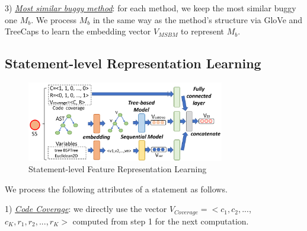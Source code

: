 
3) {\em \underline{Most similar buggy method}}: for each method, we
keep the most similar buggy one $M_b$. We process $M_b$ in the same
way as the method's structure via GloVe and TreeCaps to learn the
embedding vector $V_{MSBM}$ to represent $M_b$.


\subsection{Statement-level Representation Learning}

\begin{figure}[t]
	\centering
	\includegraphics[width=3.4in]{graphs/step-2-statement-new.png}
	\caption{Statement-level Feature Representation Learning}
	\label{statement-level-feature-learning}
\end{figure}

We process the following attributes of a statement as follows.

1) {\em \underline{Code Coverage}}: we directly use the vector
$V_{Coverage} = <c_1, c_2, ...$, $c_K, r_1, r_2, ..., r_K>$ computed
from step 1 for the next computation.


